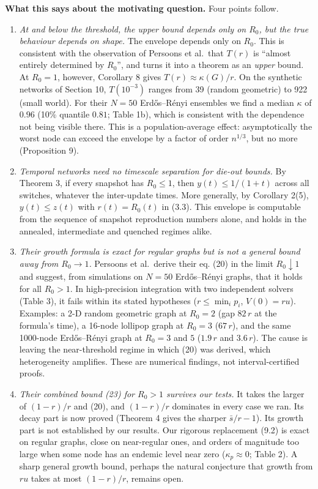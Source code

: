\documentclass[
  11pt,
  a4paper,
]{article}
\providecommand{\tightlist}{%
  \setlength{\itemsep}{0pt}\setlength{\parskip}{0pt}}
\begin{document}
\textbf{What this says about the motivating question.} Four points
follow.

\begin{enumerate}
\def\labelenumi{\arabic{enumi}.}
\tightlist
\item
  \emph{At and below the threshold, the upper bound depends only on
  \(R_0\), but the true behaviour depends on shape.} The envelope
  depends only on \(R_0\). This is consistent with the observation of
  Persoons et al.~that \(T(r)\) is ``almost entirely determined by
  \(R_0\)'', and turns it into a theorem as an \emph{upper} bound. At
  \(R_0=1\), however, Corollary 8 gives \(T(r)\approx\kappa(G)/r\). On
  the synthetic networks of Section 10, \(T(10^{-3})\) ranges from 39
  (random geometric) to 922 (small world). For their \(N=50\)
  Erdős--Rényi ensembles we find a median \(\kappa\) of \(0.96\) (10\%
  quantile \(0.81\); Table 1b), which is consistent with the dependence
  not being visible there. This is a population-average effect:
  asymptotically the worst node can exceed the envelope by a factor of
  order \(n^{1/3}\), but no more (Proposition 9).
\item
  \emph{Temporal networks need no timescale separation for die-out
  bounds.} By Theorem 3, if every snapshot has \(R_0\le1\), then
  \(y(t)\le1/(1+t)\) across all switches, whatever the inter-update
  times. More generally, by Corollary 2(5), \(y(t)\le z(t)\) with
  \(r(t)=R_0(t)\) in (3.3). This envelope is computable from the
  sequence of snapshot reproduction numbers alone, and holds in the
  annealed, intermediate and quenched regimes alike.
\item
  \emph{Their growth formula is exact for regular graphs but is not a
  general bound away from \(R_0\to1\).} Persoons et al.~derive their eq.
  (20) in the limit \(R_0\downarrow1\) and suggest, from simulations on
  \(N=50\) Erdős--Rényi graphs, that it holds for all \(R_0>1\). In
  high-precision integration with two independent solvers (Table 3), it
  fails within its stated hypotheses (\(r\le\min_ip_i\), \(V(0)=ru\)).
  Examples: a 2-D random geometric graph at \(R_0=2\) (gap \(82\,r\) at
  the formula's time), a 16-node lollipop graph at \(R_0=3\)
  (\(67\,r\)), and the same 1000-node Erdős--Rényi graph at \(R_0=3\)
  and \(5\) (\(1.9\,r\) and \(3.6\,r\)). The cause is leaving the
  near-threshold regime in which (20) was derived, which heterogeneity
  amplifies. These are numerical findings, not interval-certified
  proofs.
\item
  \emph{Their combined bound (23) for \(R_0>1\) survives our tests.} It
  takes the larger of \((1-r)/r\) and (20), and \((1-r)/r\) dominates in
  every case we ran. Its decay part is now proved (Theorem 4 gives the
  sharper \(\bar s/r-1\)). Its growth part is not established by our
  results. Our rigorous replacement (9.2) is exact on regular graphs,
  close on near-regular ones, and orders of magnitude too large when
  some node has an endemic level near zero (\(\kappa_p\approx0\); Table
  2). A sharp general growth bound, perhaps the natural conjecture that
  growth from \(ru\) takes at most \((1-r)/r\), remains open.
\end{enumerate}
\end{document}
